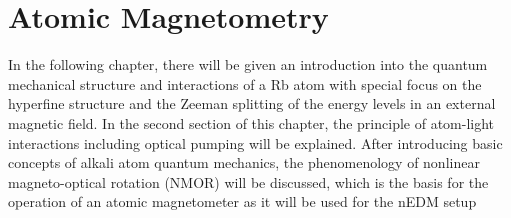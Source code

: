 \chapter{Atomic Magnetometry\label{ch:magnetometry}}


 In the following chapter, there will be given an introduction into the quantum mechanical
structure and interactions of a Rb atom with special focus on the hyperfine structure and the Zeeman splitting of the energy levels in an external magnetic field. In the second section of this chapter, the principle of atom-light interactions including optical pumping
will be explained. After introducing basic concepts of alkali atom quantum mechanics, the phenomenology of nonlinear magneto-optical rotation (NMOR) will be discussed, which is the basis for the operation of an atomic magnetometer as it will be used for the nEDM setup

